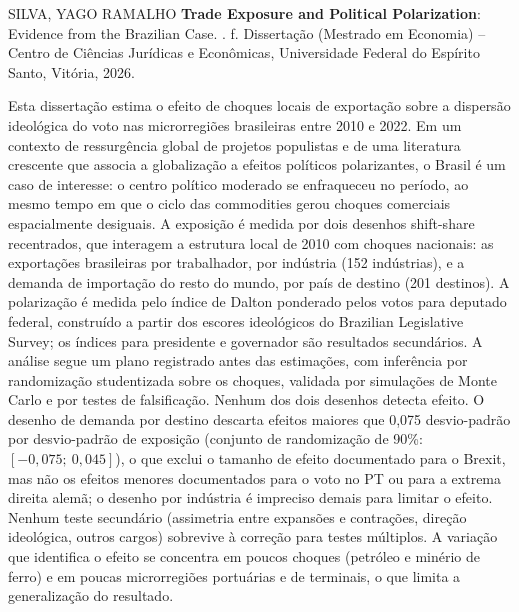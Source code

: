 \documentclass[
	11pt,				%
	oneside,			%
	a4paper,			%
	english,			%
	english				%
	]{abntex2ppgsi}
\theoremstyle{plain}
\theoremstyle{remark}
\theoremstyle{plain}%
\theoremstyle{remark}%
\begin{document}

\setlength{\absparsep}{18pt} %
\begin{resumo}

% 
%
% 
%
\begin{flushleft}
SILVA, YAGO RAMALHO \textbf{Trade Exposure and Political Polarization}: Evidence from the Brazilian Case. \imprimirdata. \pageref{LastPage} f. Dissertação (Mestrado em Economia) – Centro de Ciências Jurídicas e Econômicas, Universidade Federal do Espírito Santo, Vitória, 2026.
\end{flushleft}

Esta dissertação estima o efeito de choques locais de exportação sobre a dispersão ideológica do voto nas microrregiões brasileiras entre 2010 e 2022. Em um contexto de ressurgência global de projetos populistas e de uma literatura crescente que associa a globalização a efeitos políticos polarizantes, o Brasil é um caso de interesse: o centro político moderado se enfraqueceu no período, ao mesmo tempo em que o ciclo das commodities gerou choques comerciais espacialmente desiguais.
A exposição é medida por dois desenhos shift-share recentrados, que interagem a estrutura local de 2010 com choques nacionais: as exportações brasileiras por trabalhador, por indústria (152 indústrias), e a demanda de importação do resto do mundo, por país de destino (201 destinos). A polarização é medida pelo índice de Dalton ponderado pelos votos para deputado federal, construído a partir dos escores ideológicos do Brazilian Legislative Survey; os índices para presidente e governador são resultados secundários. A análise segue um plano registrado antes das estimações, com inferência por randomização studentizada sobre os choques, validada por simulações de Monte Carlo e por testes de falsificação.
Nenhum dos dois desenhos detecta efeito. O desenho de demanda por destino descarta efeitos maiores que 0,075 desvio-padrão por desvio-padrão de exposição (conjunto de randomização de 90\%: $[-0{,}075;\ 0{,}045]$), o que exclui o tamanho de efeito documentado para o Brexit, mas não os efeitos menores documentados para o voto no PT ou para a extrema direita alemã; o desenho por indústria é impreciso demais para limitar o efeito. Nenhum teste secundário (assimetria entre expansões e contrações, direção ideológica, outros cargos) sobrevive à correção para testes múltiplos. A variação que identifica o efeito se concentra em poucos choques (petróleo e minério de ferro) e em poucas microrregiões portuárias e de terminais, o que limita a generalização do resultado.


\end{resumo}
\end{document}
